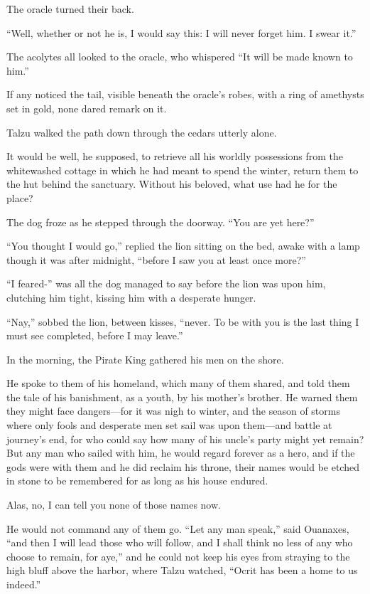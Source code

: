 The oracle turned their back.

``Well, whether or not he is, I would say this: I will never forget him. I swear it.''

The acolytes all looked to the oracle, who whispered ``It will be made known to him.''

If any noticed the tail, visible beneath the oracle's robes, with a ring of amethysts set in gold, none dared remark on it.

\secdiv

Talzu walked the path down through the cedars utterly alone.

It would be well, he supposed, to retrieve all his worldly possessions from the whitewashed cottage in which he had meant to spend the winter, return them to the hut behind the sanctuary. Without his beloved, what use had he for the place?

The dog froze as he stepped through the doorway. ``You are yet here?''

``You thought I would go,'' replied the lion sitting on the bed, awake with a lamp though it was after midnight, ``before I saw you at least once more?''

``I feared-'' was all the dog managed to say before the lion was upon him, clutching him tight, kissing him with a desperate hunger.

``Nay,'' sobbed the lion, between kisses, ``never. To be with you is the last thing I must see completed, before I may leave.''

\secdiv

In the morning, the Pirate King gathered his men on the shore.

He spoke to them of his homeland, which many of them shared, and told them the tale of his banishment, as a youth, by his mother's brother. He warned them they might face dangers---for it was nigh to winter, and the season of storms where only fools and desperate men set sail was upon them---and battle at journey's end, for who could say how many of his uncle's party might yet remain? But any man who sailed with him, he would regard forever as a hero, and if the gods were with them and he did reclaim his throne, their names would be etched in stone to be remembered for as long as his house endured.

Alas, no, I can tell you none of those names now.

He would not command any of them go. ``Let any man speak,'' said Ouanaxes, ``and then I will lead those who will follow, and I shall think no less of any who choose to remain, for aye,'' and he could not keep his eyes from straying to the high bluff above the harbor, where Talzu watched, ``Ocrit has been a home to us indeed.''

